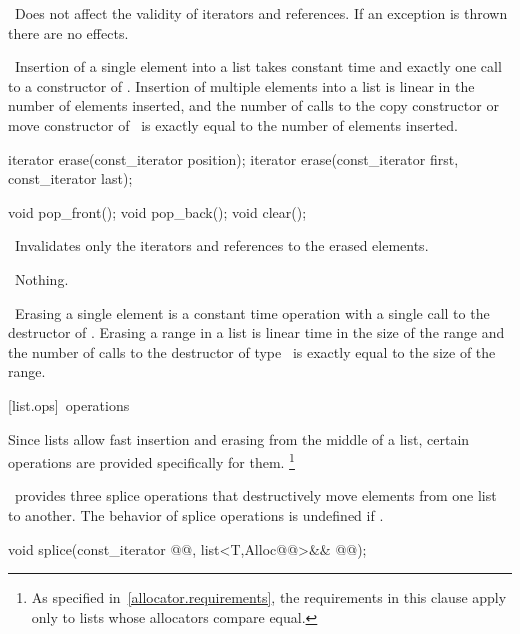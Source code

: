\documentclass[american,twoside]{book}
\begin{document}
\begin{itemdescr}
\pnum
\notes\ 
Does not affect the validity of iterators and references.
If an exception is thrown there are no effects.

\pnum
\complexity\ 
Insertion of a single element into a list takes constant time and
exactly one call to a constructor of
. Insertion of multiple elements into a list is linear in the
number of elements inserted, and the number of calls to the copy
constructor or move constructor of \tcode{T}\ is exactly equal
to the number of elements inserted.
\end{itemdescr}

%
\begin{itemdecl}
iterator erase(const_iterator position);
iterator erase(const_iterator first, const_iterator last);

void pop_front();
void pop_back();
void clear();
\end{itemdecl}

\begin{itemdescr}
\pnum
\effects\ 
Invalidates only the iterators and references to the erased elements.

\pnum
\throws\ 
Nothing.

\pnum
\complexity\ 
Erasing a single element is a constant time operation with a single call to the destructor of
\tcode{T}.
Erasing a range in a list is linear time in the
size of the range and the number of calls to the destructor of type
\tcode{T}\
is exactly equal to the size of the range.
\end{itemdescr}

\rSec3[list.ops]{\tcode{list}\ operations}

\pnum
Since lists allow fast insertion and erasing from the middle of a list, certain operations are provided
specifically for them.%
\footnote{As specified in~\ref{allocator.requirements}, the requirements
in this clause apply only to lists whose allocators compare equal.
}

\pnum
\tcode{list}\
provides three splice operations that destructively move elements from one list to another. The behavior of splice operations is undefined if .

\index{splice@\tcode{splice}!\tcode{list}}%
\begin{itemdecl}
void splice(const_iterator @@, list<T,Alloc@@>&& @@);
\end{itemdecl}
\end{document}

